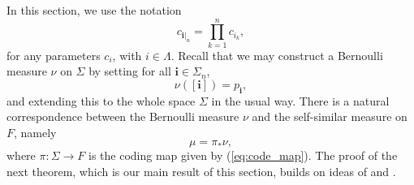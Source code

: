\documentclass{PRM}
\theoremstyle{plain}
\theoremstyle{definition}
\theoremstyle{remark}
\begin{document}
In this section, we use the notation
\begin{equation*}
    c_{\mathbf{i}|_n}=\prod_{k=1}^nc_{i_k},
\end{equation*}
for any parameters $c_i$, with $i\in\Lambda$. Recall that we may construct a Bernoulli measure $\nu$ on $\Sigma$ by setting for all $\mathbf{i}\in\Sigma_n$,
\begin{equation*}
    \nu([\mathbf{i}])=p_{\mathbf{i}},
\end{equation*}
and extending this to the whole space $\Sigma$ in the usual way. There is a natural correspondence between the Bernoulli measure $\nu$ and the self-similar measure on $F$, namely
\begin{equation}\label{eq:bernoulli}
    \mu=\pi_*\nu,
\end{equation}
where $\pi\colon \Sigma\to F$ is the coding map given by (\ref{eq:code_map}). The proof of the next theorem, which is our main result of this section, builds on ideas of \cite{Yung} and \cite{FH}.
\end{document}
